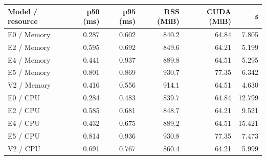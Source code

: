 \begin{tabular}{lrrrrr}
\toprule
Model / resource & p50 (ms) & p95 (ms) & RSS (MiB) & CUDA (MiB) & s \\
\midrule
E0 / Memory & 0.287 & 0.602 & 840.2 & 64.84 & 7.805 \\
E2 / Memory & 0.595 & 0.692 & 849.6 & 64.21 & 5.199 \\
E4 / Memory & 0.441 & 0.937 & 889.8 & 64.51 & 5.295 \\
E5 / Memory & 0.801 & 0.869 & 930.7 & 77.35 & 6.342 \\
V2 / Memory & 0.416 & 0.556 & 914.1 & 64.51 & 4.630 \\
E0 / CPU & 0.284 & 0.483 & 839.7 & 64.84 & 12.799 \\
E2 / CPU & 0.585 & 0.681 & 848.7 & 64.21 & 9.521 \\
E4 / CPU & 0.432 & 0.675 & 889.2 & 64.51 & 15.421 \\
E5 / CPU & 0.814 & 0.936 & 930.8 & 77.35 & 7.473 \\
V2 / CPU & 0.691 & 0.767 & 860.4 & 64.21 & 5.999 \\
\bottomrule
\end{tabular}
